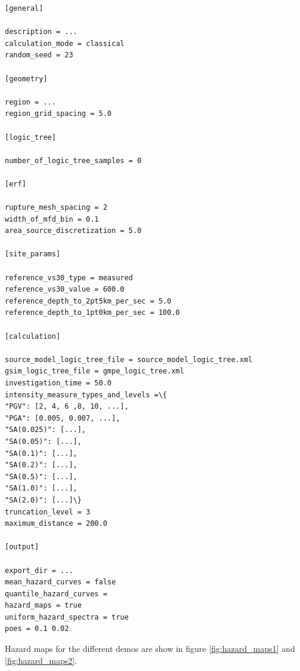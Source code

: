 \begin{Verbatim}[frame=single, commandchars=\\\{\}, fontsize=\normalsize]
[general]

description = ...
calculation_mode = classical
random_seed = 23

[geometry]

region = ...
region_grid_spacing = 5.0

[logic_tree]

number_of_logic_tree_samples = 0

[erf]

rupture_mesh_spacing = 2
width_of_mfd_bin = 0.1
area_source_discretization = 5.0

[site_params]

reference_vs30_type = measured
reference_vs30_value = 600.0
reference_depth_to_2pt5km_per_sec = 5.0
reference_depth_to_1pt0km_per_sec = 100.0

[calculation]

source_model_logic_tree_file = source_model_logic_tree.xml
gsim_logic_tree_file = gmpe_logic_tree.xml
investigation_time = 50.0
intensity_measure_types_and_levels =\{
"PGV": [2, 4, 6 ,8, 10, ...], 
"PGA": [0.005, 0.007, ...], 
"SA(0.025)": [...], 
"SA(0.05)": [...],
"SA(0.1)": [...], 
"SA(0.2)": [...], 
"SA(0.5)": [...], 
"SA(1.0)": [...],
"SA(2.0)": [...]\}
truncation_level = 3
maximum_distance = 200.0

[output]

export_dir = ...
mean_hazard_curves = false
quantile_hazard_curves =
hazard_maps = true
uniform_hazard_spectra = true
poes = 0.1 0.02
\end{Verbatim}
Hazard maps for the different demos are show in figure \ref{fig:hazard_maps1} and \ref{fig:hazard_maps2}.

